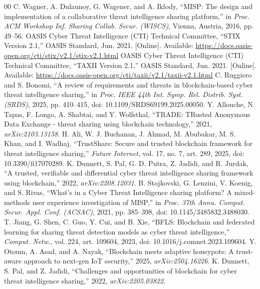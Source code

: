 \documentclass[conference]{IEEEtran}
\begin{document}
{\footnotesize
\begin{thebibliography}{00}
\setlength{\itemsep}{0pt plus 0.3pt}
 C. Wagner, A. Dulaunoy, G. Wagener, and A. Iklody, ``MISP: The design and implementation of a collaborative threat intelligence sharing platform,'' in \emph{Proc. ACM Workshop Inf. Sharing Collab. Secur. (WISCS)}, Vienna, Austria, 2016, pp. 49--56.
 OASIS Cyber Threat Intelligence (CTI) Technical Committee, ``STIX Version 2.1,'' OASIS Standard, Jun. 2021. [Online]. Available: \url{https://docs.oasis-open.org/cti/stix/v2.1/stix-v2.1.html}
 OASIS Cyber Threat Intelligence (CTI) Technical Committee, ``TAXII Version 2.1,'' OASIS Standard, Jun. 2021. [Online]. Available: \url{https://docs.oasis-open.org/cti/taxii/v2.1/taxii-v2.1.html}
 C. Ruggiero and S. Bonomi, ``A review of requirements and threats in blockchain-based cyber threat intelligence sharing,'' in \emph{Proc. IEEE 44th Int. Symp. Rel. Distrib. Syst. (SRDS)}, 2025, pp. 410--415, doi: 10.1109/SRDS69199.2025.00050.
 Y. Allouche, N. Tapas, F. Longo, A. Shabtai, and Y. Wolfsthal, ``TRADE: TRusted Anonymous Data Exchange - threat sharing using blockchain technology,'' 2021, \emph{arXiv:2103.13158}.
 H. Ali, W. J. Buchanan, J. Ahmad, M. Abubakar, M. S. Khan, and I. Wadhaj, ``TrustShare: Secure and trusted blockchain framework for threat intelligence sharing,'' \emph{Future Internet}, vol. 17, no. 7, art. 289, 2025, doi: 10.3390/fi17070289.
 K. Dunnett, S. Pal, G. D. Putra, Z. Jadidi, and R. Jurdak, ``A trusted, verifiable and differential cyber threat intelligence sharing framework using blockchain,'' 2022, \emph{arXiv:2208.12031}.
 B. Stojkovski, G. Lenzini, V. Koenig, and S. Rivas, ``What's in a Cyber Threat Intelligence sharing platform? A mixed-methods user experience investigation of MISP,'' in \emph{Proc. 37th Annu. Comput. Secur. Appl. Conf. (ACSAC)}, 2021, pp. 385--398, doi: 10.1145/3485832.3488030.
 T. Jiang, G. Shen, C. Guo, Y. Cui, and B. Xie, ``BFLS: Blockchain and federated learning for sharing threat detection models as cyber threat intelligence,'' \emph{Comput. Netw.}, vol. 224, art. 109604, 2023, doi: 10.1016/j.comnet.2023.109604.
 Y. Otoum, A. Asad, and A. Nayak, ``Blockchain meets adaptive honeypots: A trust-aware approach to next-gen IoT security,'' 2025, \emph{arXiv:2504.16226}.
 K. Dunnett, S. Pal, and Z. Jadidi, ``Challenges and opportunities of blockchain for cyber threat intelligence sharing,'' 2022, \emph{arXiv:2205.03822}.

\end{thebibliography}}
\end{document}
